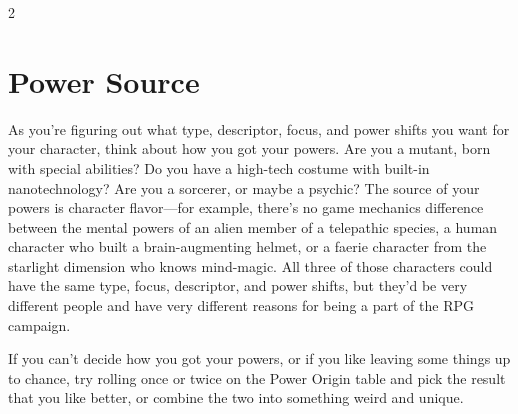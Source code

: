 \begin{multicols}{2}

\chapter{Power Source}

As you’re figuring out what type, descriptor, focus, and power shifts you want for
your character, think about how you got your powers. Are you a mutant, born with special abilities? Do you have a high-tech costume with built-in nanotechnology? Are you a sorcerer, or maybe a psychic? The source of your powers is character flavor—for example, there’s no game mechanics difference between the mental powers of an alien member of a telepathic species, a human character who built a brain-augmenting helmet, or a faerie character from the starlight dimension who knows mind-magic. All three of those characters could have the same type, focus, descriptor, and power shifts, but they’d be very different people and have very different reasons for being a part of the RPG campaign.

If you can’t decide how you got your powers, or if you like leaving some things up to chance, try rolling once or twice on the Power Origin table and pick the result that you like better, or combine the two into something weird and unique.

\end{multicols}

